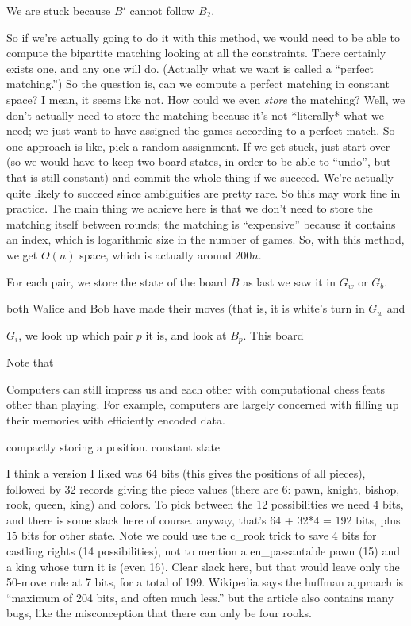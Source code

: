 \documentclass[twocolumn]{amsart}
\begin{document}
We are stuck because $B'$ cannot follow $B_2$.

So if we're actually going to do it with this method, we would
need to be able to compute the bipartite matching looking at all
the constraints. There certainly exists one, and any one will do. 
(Actually what we want is called a ``perfect matching.'')
So the question is, can we compute a perfect matching in constant
space? I mean, it seems like not. How could we even {\em store}
the matching? Well, we don't actually need to store the matching
because it's not *literally* what we need; we just want to have
assigned the games according to a perfect match. So one approach
is like, pick a random assignment. If we get stuck, just start
over (so we would have to keep two board states, in order to
be able to ``undo'', but that is still constant) and commit
the whole thing if we succeed. We're actually quite likely to
succeed since ambiguities are pretty rare. So this may work
fine in practice. The main thing we achieve here is that we
don't need to store the matching itself between rounds; the
matching is ``expensive'' because it contains an index, which
is logarithmic size in the number of games. So, with this
method, we get $O(n)$ space, which is actually around $200 n$.


For each pair, we store the state of the board $B$
as last we saw it in $G_w$ or $G_b$.

both Walice and Bob have made their moves (that is, it is white's turn
in $G_w$ and 

$G_i$, we look up which pair $p$ it is, and look at $B_p$. This board


Note that 

Computers can still impress us and each other with computational chess
feats other than playing. For example, computers are largely concerned
with filling up their memories with efficiently encoded data.

compactly storing a position. constant state

I think a version I liked was 64 bits (this gives the positions of all
pieces), followed by 32 records giving the piece values (there are 6:
pawn, knight, bishop, rook, queen, king) and colors. To pick between
the 12 possibilities we need 4 bits, and there is some slack here of
course. anyway, that's 64 + 32*4 = 192 bits, plus 15 bits for other
state. Note we could use the c\_rook trick to save 4 bits for castling
rights (14 possibilities), not to mention a en\_passantable pawn (15)
and a king whose turn it is (even 16). Clear slack here, but that
would leave only the 50-move rule at 7 bits, for a total of 199.
Wikipedia says the huffman approach is ``maximum of 204 bits, and
often much less.'' but the article also contains many bugs, like
the misconception that there can only be four rooks. 
\end{document}
